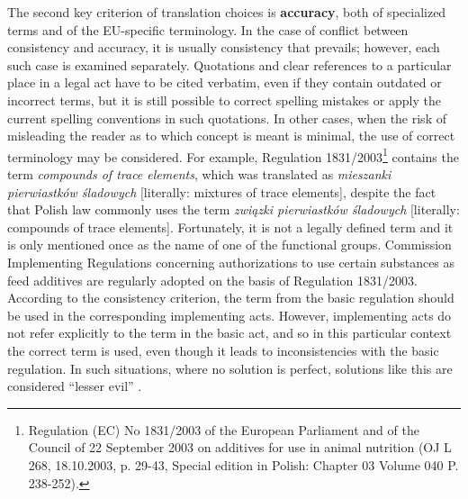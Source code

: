 \documentclass[output=paper]{langsci/langscibook}
\begin{document}
The second key criterion of translation choices is \textbf{accuracy}, both of specialized terms and of the EU-specific terminology. In the case of conflict between consistency and accuracy, it is usually consistency that prevails; however, each such case is examined separately. Quotations and clear references to a particular place in a legal act have to be cited verbatim, even if they contain outdated or incorrect terms, but it is still possible to correct spelling mistakes or apply the current spelling conventions in such quotations. In other cases, when the risk of misleading the reader as to which concept is meant is minimal, the use of correct terminology may be considered. For example, Regulation 1831/2003\footnote{Regulation (EC) No 1831/2003 of the European Parliament and of the Council of 22 September 2003 on additives for use in animal nutrition (OJ L 268, 18.10.2003, p. 29-43, Special edition in Polish: Chapter 03 Volume 040 P. 238-252).} contains the term \textit{compounds of trace elements}, which was translated as \textit{mieszanki pierwiastków śladowych} [literally: mixtures of trace elements], despite the fact that Polish law commonly uses the term \textit{związki pierwiastków śladowych} [literally: compounds of trace elements]. Fortunately, it is not a legally defined term and it is only mentioned once as the name of one of the functional groups. Commission Implementing Regulations concerning authorizations to use certain substances as feed additives are regularly adopted on the basis of Regulation 1831/2003. According to the consistency criterion, the term from the basic regulation should be used in the corresponding implementing acts. However, implementing acts do not refer explicitly to the term in the basic act, and so in this particular context the correct term is used, even though it leads to inconsistencies with the basic regulation. In such situations, where no solution is perfect, solutions like this are considered “lesser evil” \citep[61]{Stefaniak2013}.
\end{document}
